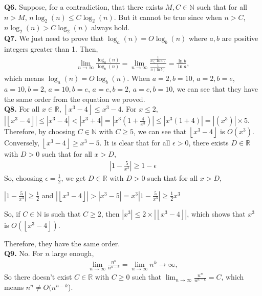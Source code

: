 \documentclass{article}[12pt]
\begin{document}
\noindent \textbf{Q6.}
Suppose, for a contradiction, that there exists $M,C\in \mathbb{N}$ such that for all $n>M$, $n \log _{2}(n)\leq C\log _{2}(n)$. But it cannot be true since when $n>C$, $n \log _{2}(n)> C\log _{2}(n)$ always hold.\\

\noindent \textbf{Q7.}
We just need to prove that $\log_a(n)=O\log_b(n)$ where $a,b$ are positive integers greater than 1. Then, 
\begin{align*}
\lim_{n\rightarrow \infty}\frac{\log_a(n)}{\log_b(n)}=\lim_{n\rightarrow \infty}\frac{\frac{1}{n(\ln a)}}{\frac{1}{n(\ln b)}}=\frac{\ln b}{\ln a},
\end{align*}
which means $\log_a(n)=O\log_b(n)$. When $a=2,b=10$, $a=2,b=e$, $a=10,b=2$, $a=10,b=e$, $a=e,b=2$, $a=e,b=10$, we can see that they have the same order from the equation we proved.
\\

\noindent \textbf{Q8.}
For all $x\in \mathbb{R}$, $\left\lfloor x^{3}-4\right\rfloor\leq x^3-4$. For $x\leq 2$, $|\left\lfloor x^{3}-4\right\rfloor|\leq |x^3-4|<|x^3+4|=|x^3(1+\frac{4}{x^3})|\leq |x^3(1+4)|=|(x^3)|\times 5$. Therefore, by choosing $C\in \mathbb{N}$ with $C\geq 5$, we can see that $\left\lfloor x^{3}-4\right\rfloor$ is $O(x^3)$.
Conversely, $\left\lfloor x^{3}-4\right\rfloor\geq x^3-5$. It is clear that for all $\epsilon>0$, there exists $D\in \mathbb{R}$ with $D>0$ such that for all $x>D$,
\begin{align*}
|1-\frac{5}{x^3}|\geq 1-\epsilon
\end{align*}
So, choosing $\epsilon=\frac{1}{2}$, we get $D\in \mathbb{R}$ with $D>0$ such that for all $x>D$,
\begin{center}
$|1-\frac{5}{x^3}|\geq \frac{1}{2}$ and $|\left\lfloor x^{3}-4\right\rfloor|> |x^3-5|=x^3|1-\frac{5}{x^3}|\geq \frac{1}{2}x^3$
\end{center}
So, if $C\in \mathbb{N}$ is such that $C\geq 2$, then $|x^3|\leq 2\times |\left\lfloor x^{3}-4\right\rfloor|$, which shows that $x^3$ is $O(\left\lfloor x^{3}-4\right\rfloor)$.\par
Therefore, they have the same order.\\

\noindent \textbf{Q9.}
No. For $n$ large enough, 
\begin{align*}
\lim_{n\rightarrow \infty}\frac{n^n}{n^{n-k}}=\lim_{n\rightarrow \infty}n^k\rightarrow \infty,
\end{align*}
So there doesn't exist $C\in \mathbb{R}$ with $C\geq 0$ such that $\lim_{n\rightarrow \infty}\frac{n^n}{n^{n-k}}=C$, which means $n^n\not=O(n^{n-k}$).
\end{document}
